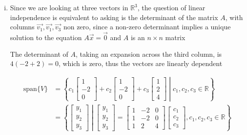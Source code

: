 \documentclass{article}
\begin{document}
\begin{enumerate}[(i)]
    Since we have a \(6\times 3\) matrix, we know there cannot be a pivot in each row, thus in the reduced row
    echelon form of the matrix there will be at least three rows of zeros, then for some \(\vec{y}\) there will 
    be inconsistencies and thus no solutions i.e. the set does not span \(\mathbb{R}^6\) since \(\vec{y}\) cannot be
    any vector in \(\mathbb{R}^6\)
    \\

    Since the three vectors are not linearly independent and they do not span \(\mathbb{R}^6\), by definition they 
    cannot form a basis of \(\mathbb{R}^6\)

    \item Since we are looking at three vectors in \(\mathbb{R}^3\), the question of linear
    independence is equivalent to asking is the determinant of the matrix \(A\), with columns \(\vec{v_1}, \vec{v_1},
    \vec{v_3}\) non zero, since a non-zero determinant implies a unique solution to the 
    equation \(A\vec{x} = \vec{0}\) and \(A\) is an \(n\times n\) matrix

    The determinant of \(A\), taking an expansion across the third column, is \(4(-2+2) = 0\), which
    is zero, thus the vectors are linearly dependent
    
    
    
    \begin{align*}
        \text{span}\{{V}\} &= \left\{c_1\begin{bmatrix}
        1\\-2\\0
        \end{bmatrix} + c_2\begin{bmatrix}
        1\\-2\\0
        \end{bmatrix} + c_3\begin{bmatrix}
        1\\2\\4
        \end{bmatrix} \middle| c_1,c_2,c_3 \in \mathbb{R}\right\}
        \\
        & = \left\{\begin{bmatrix}
        y_1\\y_2\\y_3
        \end{bmatrix} \middle| \begin{bmatrix}
        y_1\\y_2\\y_3
        \end{bmatrix} = \begin{bmatrix}
        1&-2&0\\1&-2&0 \\ 1&2&4
        \end{bmatrix}\begin{bmatrix}
        c_1\\c_2\\c_3
        \end{bmatrix}, c_1,c_2,c_3 \in \mathbb{R}\right\}
    \end{align*}


\end{enumerate}
\end{document}
